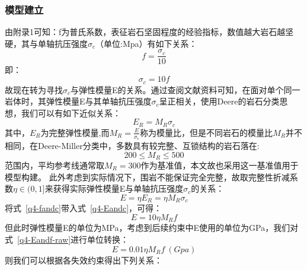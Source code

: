 \documentclass[UTF-8,a4paper,zihao=-4]{ctexart}
\begin{document}
\subsubsection{模型建立}
由附录1可知：f为普氏系数，表征岩石坚固程度的经验指标，数值越大岩石越坚硬，其与单轴抗压强度$\sigma_c$（单位:Mpa）有如下关系：
\begin{equation}
    f=\frac{\sigma_c}{10}
\label{q4-fandc}
\end{equation}
即：
\begin{equation}
    \sigma_c=10f
\end{equation}
故现在转为寻找$\sigma_c$与弹性模量E的关系。通过查阅文献资料可知，在面对单个同一岩体时，其弹性模量E与其单轴抗压强度$\sigma_c$呈正相关\cite{lin2017ucs}，使用Deere的岩石分类思想\cite{deere1966engineering}，我们可以有如下近似关系：
\begin{equation}
    E_R=M_R\sigma_c
\end{equation}
其中，$E_R$为完整弹性模量,而$M_R=\frac{E}{\sigma_c}$称为模量比，但是不同岩石的模量比$M_R$并不相同，在Deere-Miller分类中，多数具有较完整、互锁结构的岩石落在:
\begin{equation*}
    200\le M_R \le500
\end{equation*}
范围内，平均参考线通常取$M_R=300$作为基准值\cite{deere1966engineering}，本文故也采用这一基准值用于模型构建。
此外考虑到实际情况下，围岩不能保证完全完整，故取完整性折减系数$\eta\in(0,1]$来获得实际弹性模量E与单轴抗压强度$\sigma_c$的关系：
\begin{equation}
    E=\eta E_R=\eta M_R\sigma_c
\label{q4-Eandc}
\end{equation}
将式~\ref{q4-fandc}带入式~\ref{q4-Eandc}，可得：
\begin{equation}
    E=10\eta M_Rf
\label{q4-Eandf-raw}
\end{equation}
但此时弹性模量E的单位为MPa，考虑到后续约束中E使用的单位为GPa，我们对式~\ref{q4-Eandf-raw}进行单位转换：
\begin{equation}
    E=0.01\eta M_Rf ~(Gpa)
\label{q4-Eandf}
\end{equation}
则我们可以根据各失效约束得出下列关系：
\end{document}
